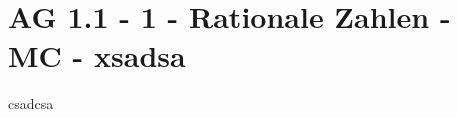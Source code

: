 \section{AG 1.1 - 1 - Rationale Zahlen - MC - xsadsa}

\begin{beispiel}[AG 1.1]{1}
csadcsa
\end{beispiel}